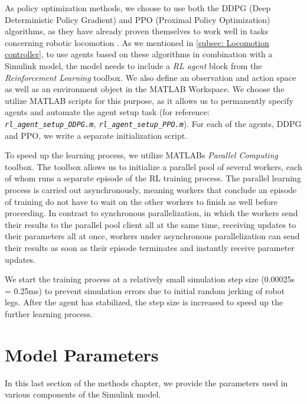 As policy optimization methods, we choose to use both the DDPG (Deep Deterministic Policy Gradient) and PPO (Proximal Policy Optimization) algorithms, as they have already proven themselves to work well in tasks concerning robotic locomotion \parencite{lillicrap2015continuous, ouyang2021adaptive, schilling2021decentralized}.
As we mentioned in \ref{subsec: Locomotion controller}, to use agents based on these algorithms in combination with a Simulink model, the model needs to include a \textit{RL agent} block from the \textit{Reinforcement Learning} toolbox.
We also define an observation and action space as well as an environment object in the MATLAB Workspace.
We choose the utilize MATLAB scripts for this purpose, as it allows us to permanently specify agents and automate the agent setup task (for reference: \emph{\nolinkurl{rl_agent_setup_DDPG.m}, \nolinkurl{rl_agent_setup_PPO.m}}).
For each of the agents, DDPG and PPO, we write a separate initialization script.

To speed up the learning process, we utilize MATLABs \emph{Parallel Computing} toolbox.
The toolbox allows us to initialize a parallel pool of several workers, each of whom runs a separate episode of the RL training process.
The parallel learning process is carried out asynchronously, meaning workers that conclude an episode of training do not have to wait on the other workers to finish as well before proceeding.
In contrast to synchronous parallelization, in which the workers send their results to the parallel pool client all at the same time, receiving updates to their parameters all at once, workers under asynchronous parallelization can send their results as soon as their episode terminates and instantly receive parameter updates.

We start the training process at a relatively small simulation step size (0.00025s = 0.25ms) to prevent simulation errors due to initial random jerking of robot legs.
After the agent has stabilized, the step size is increased to speed up the further learning process.

\section{Model Parameters}
In this last section of the methods chapter, we provide the parameters used in various components of the Simulink model.

